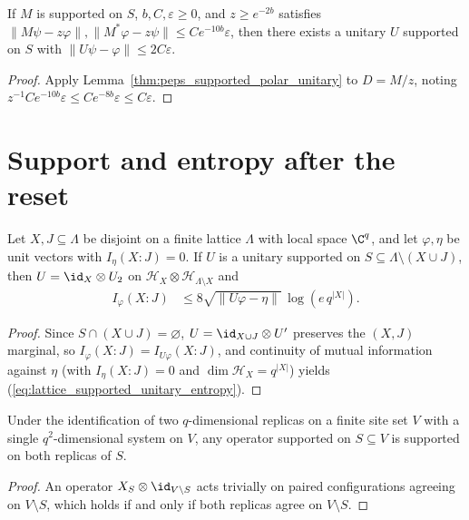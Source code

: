 \begin{lemma}
    \label{thm:peps_reset_polar_step}
    \leanok
    If $M$ is supported on $S$, $b,C,\varepsilon\ge0$, and $z\ge e^{-2b}$ satisfies $\|M\psi-z\varphi\|,\|M^*\varphi-z\psi\|\le Ce^{-10b}\varepsilon$, then there exists a unitary $U$ supported on $S$ with $\|U\psi-\varphi\|\le2C\varepsilon$.
\end{lemma}
\begin{proof}
    \leanok
    Apply Lemma~\ref{thm:peps_supported_polar_unitary} to $D=M/z$, noting $z^{-1}Ce^{-10b}\varepsilon\le Ce^{-8b}\varepsilon\le C\varepsilon$.
\end{proof}

\section{Support and entropy after the reset}

\begin{lemma}
    \label{lem:lattice_supported_unitary_entropy}
    \leanok
    Let $X,J\subseteq\Lambda$ be disjoint on a finite lattice $\Lambda$ with local space $\C^q$, and let $\varphi,\eta$ be unit vectors with $I_\eta(X:J)=0$. If $U$ is a unitary supported on $S\subseteq\Lambda\setminus(X\cup J)$, then $U=\id_X\otimes U_2$ on $\mathcal H_X\otimes\mathcal H_{\Lambda\setminus X}$ and
    \begin{align}
        I_\varphi(X:J) & \le8\sqrt{\lVert U\varphi-\eta\rVert}\,\log(e\,q^{|X|}).
        \label{eq:lattice_supported_unitary_entropy}
    \end{align}
\end{lemma}
\begin{proof}\leanok
    Since $S\cap(X\cup J)=\varnothing$, $U=\id_{X\cup J}\otimes U'$ preserves the $(X,J)$ marginal, so $I_\varphi(X:J)=I_{U\varphi}(X:J)$, and continuity of mutual information against $\eta$ (with $I_\eta(X:J)=0$ and $\dim\mathcal H_X=q^{|X|}$) yields (\ref{eq:lattice_supported_unitary_entropy}).
\end{proof}

\begin{lemma}
    \label{thm:peps_reset_paired_support}
    \leanok
    Under the identification of two $q$-dimensional replicas on a finite site set $V$ with a single $q^2$-dimensional system on $V$, any operator supported on $S\subseteq V$ is supported on both replicas of $S$.
\end{lemma}
\begin{proof}
    \leanok
    An operator $X_S\otimes\id_{V\setminus S}$ acts trivially on paired configurations agreeing on $V\setminus S$, which holds if and only if both replicas agree on $V\setminus S$.
\end{proof}

